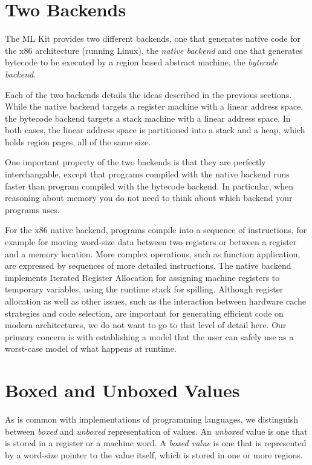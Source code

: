 \documentclass[12pt]{book}
\begin{document}
\section{Two Backends}
%
%
The ML Kit provides two different backends, one that generates native
code for the x86 architecture (running Linux), the {\em native
  backend\/} and one that generates bytecode to be executed by a
region based abstract machine, the {\em bytecode backend}.

Each of the two backends details the ideas described in the previous
sections. While the native backend targets a register machine with a
linear address space, the bytecode backend targets a stack machine
with a linear address space. In both cases, the linear address space
is partitioned into a stack and a heap, which holds region pages, all
of the same size.

One important property of the two backends is that they are perfectly
interchangable, except that programs compiled with the native backend
runs faster than program compiled with the bytecode backend. In
particular, when reasoning about memory you do not need to think about
which backend your programs uses.

For the x86 native backend, programs compile into a sequence of
instructions, for example for moving word-size data between two
registers or between a register and a memory location.  More complex
operations, such as function application, are expressed by sequences
of more detailed instructions. The native backend implements Iterated
Register Allocation \cite{appel96} for assigning machine registers to
temporary variables, using the runtime stack for spilling.  Although
register allocation as well as other issues, such as the interaction
between hardware cache strategies and code selection, are important
for generating efficient code on modern architectures, we do not 
want to go to that level of detail here. Our primary concern is with
establishing a model that the user can safely use as a worst-case
model of what happens at runtime.

\section{Boxed and Unboxed Values}
\label{boxing.sec}
%
%
%
As is common with implementations of programming languages, we
distinguish between {\em boxed\/} and {\em unboxed\/} representation
of values.  An {\em unboxed\/} value is one that is stored in a
register or a machine word. A {\em boxed value\/} is one that is
represented by a word-size pointer to the value itself, which is
stored in one or more regions.
\end{document}
